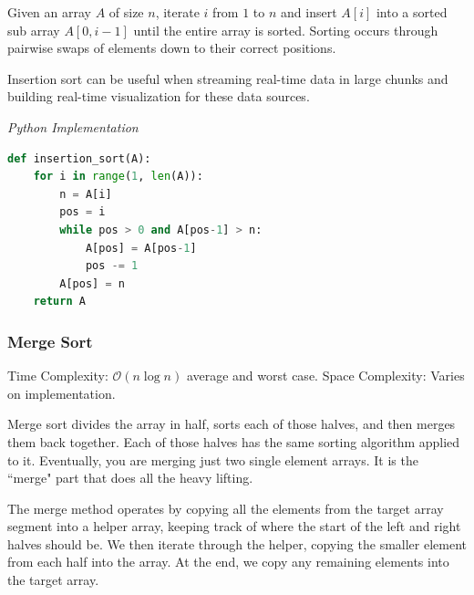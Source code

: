 \documentclass{article}
\newcommand{\bigO}{\mathcal{O}}
\begin{document}
    Given an array $A$ of size $n$, iterate $i$ from $1$ to $n$ and insert $A[i]$ into a sorted sub array $A[0, i-1]$ until the entire array is sorted. Sorting occurs through pairwise swaps of elements down to their correct positions.
    
    Insertion sort can be useful when streaming real-time data in large chunks and building real-time visualization for these data sources.

\vspace{8pt} \emph{Python Implementation}
\begin{lstlisting}[language=Python]
def insertion_sort(A):
    for i in range(1, len(A)):
        n = A[i]
        pos = i
        while pos > 0 and A[pos-1] > n:
            A[pos] = A[pos-1]
            pos -= 1
        A[pos] = n
    return A
\end{lstlisting}

    \subsubsection{Merge Sort}
    Time Complexity: $\bigO( n \log n )$ average and worst case. Space Complexity: Varies on implementation. 
    
    Merge sort divides the array in half, sorts each of those halves, and then merges them back together. Each of those halves has the same sorting algorithm applied to it. Eventually, you are merging just two single element arrays. It is the ``merge" part that does all the heavy lifting.
    
    The merge method operates by copying all the elements from the target array segment into a helper array, keeping track of where the start of the left and right halves should be. We then iterate through the helper, copying the smaller element from each half into the array. At the end, we copy any remaining elements into the target array.
    
\end{document}
